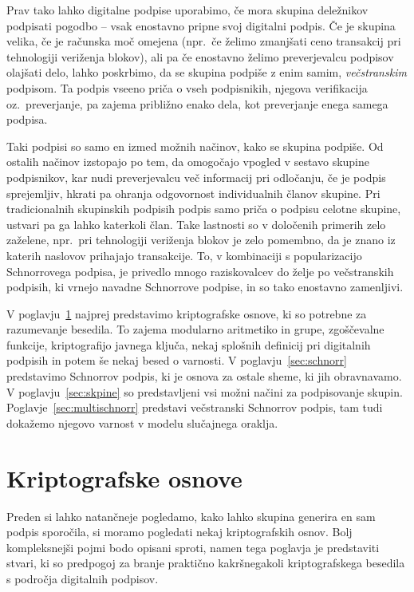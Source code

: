 \documentclass[isrm2, tisk]{fmfdelo}
\begin{document}
Prav tako lahko digitalne podpise uporabimo, če mora skupina deležnikov podpisati pogodbo -- vsak
enostavno pripne svoj digitalni podpis. Če je skupina velika, če je računska moč omejena
(npr.\ če želimo zmanjšati ceno transakcij pri tehnologiji veriženja blokov), ali pa če enostavno
želimo preverjevalcu podpisov olajšati delo, lahko poskrbimo, da se skupina podpiše z enim samim,
\textit{večstranskim} podpisom. Ta podpis vseeno priča o vseh podpisnikih, njegova verifikacija oz.\
preverjanje, pa zajema približno enako dela, kot preverjanje enega samega podpisa.

Taki podpisi so samo en izmed možnih načinov, kako se skupina podpiše. Od ostalih načinov izstopajo
po tem, da omogočajo vpogled v sestavo skupine podpisnikov, kar nudi preverjevalcu več informacij
pri odločanju, če je podpis sprejemljiv, hkrati pa ohranja odgovornost individualnih članov skupine.
Pri tradicionalnih skupinskih podpisih podpis samo priča o podpisu celotne skupine, ustvari pa ga
lahko katerkoli član. Take lastnosti so v določenih primerih zelo zaželene, npr.\ pri tehnologiji
veriženja blokov je zelo pomembno, da je znano iz katerih naslovov prihajajo transakcije. To, v
kombinaciji s popularizacijo Schnorrovega podpisa, je privedlo mnogo raziskovalcev do želje po
večstranskih podpisih, ki vrnejo navadne Schnorrove podpise, in so tako enostavno zamenljivi.

V poglavju~\ref{sec:osnove} najprej predstavimo kriptografske osnove, ki so potrebne za razumevanje besedila.
To zajema modularno aritmetiko in grupe, zgoščevalne funkcije, kriptografijo javnega ključa, nekaj
splošnih definicij pri digitalnih podpisih in potem še nekaj besed o varnosti. V poglavju~\ref{sec:schnorr}
predstavimo Schnorrov podpis, ki je osnova za ostale sheme, ki jih obravnavamo. V 
poglavju~\ref{sec:skpine} so predstavljeni vsi možni načini za podpisovanje skupin. Poglavje~\ref{sec:multischnorr}
predstavi večstranski Schnorrov podpis, tam tudi dokažemo njegovo varnost v modelu slučajnega oraklja.

\section{Kriptografske osnove}
\label{sec:osnove}
Preden si lahko natančneje pogledamo, kako lahko skupina generira en sam podpis sporočila, si moramo 
pogledati nekaj kriptografskih osnov. Bolj kompleksnejši pojmi bodo opisani sproti, namen tega 
poglavja je predstaviti stvari, ki so predpogoj za branje praktično kakršnegakoli kriptografskega 
besedila s področja digitalnih podpisov.
\end{document}
